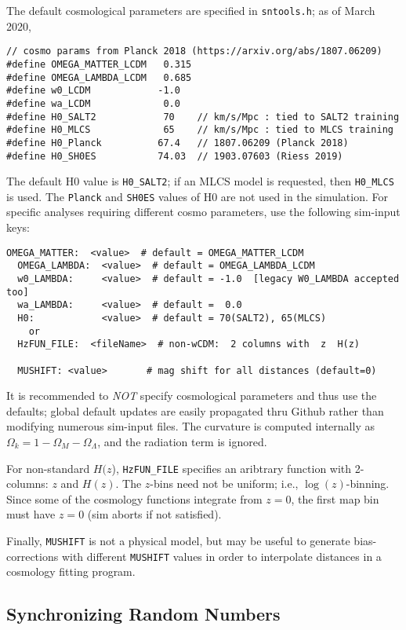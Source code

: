 \documentclass[12pt]{article}
\newcommand{\OM}{\Omega_M}
\newcommand{\OL}{\Omega_{\Lambda}}
\newcommand{\Ok}{\Omega_k}
\begin{document}
{The default cosmological parameters are specified in {\tt sntools.h};
as of March 2020,
%
\begin{Verbatim}[frame=single]
// cosmo params from Planck 2018 (https://arxiv.org/abs/1807.06209)
#define OMEGA_MATTER_LCDM   0.315 
#define OMEGA_LAMBDA_LCDM   0.685 
#define w0_LCDM            -1.0
#define wa_LCDM             0.0
#define H0_SALT2            70    // km/s/Mpc : tied to SALT2 training
#define H0_MLCS             65    // km/s/Mpc : tied to MLCS training
#define H0_Planck          67.4   // 1807.06209 (Planck 2018)
#define H0_SH0ES           74.03  // 1903.07603 (Riess 2019)
\end{Verbatim}
%
The default H0 value is {\tt H0\_SALT2};
if an MLCS model is requested, then {\tt H0\_MLCS} is used.
The {\tt Planck} and {\tt SH0ES} values of H0 are not used 
in the simulation.
For specific analyses requiring different cosmo parameters, 
use the following sim-input keys:
%
\begin{Verbatim}[frame=single]
  OMEGA_MATTER:  <value>  # default = OMEGA_MATTER_LCDM
  OMEGA_LAMBDA:  <value>  # default = OMEGA_LAMBDA_LCDM
  w0_LAMBDA:     <value>  # default = -1.0  [legacy W0_LAMBDA accepted too]
  wa_LAMBDA:     <value>  # default =  0.0
  H0:            <value>  # default = 70(SALT2), 65(MLCS)
    or
  HzFUN_FILE:  <fileName>  # non-wCDM:  2 columns with  z  H(z)

  MUSHIFT: <value>       # mag shift for all distances (default=0)
\end{Verbatim}
%
It is recommended to {\it NOT} specify cosmological parameters and thus
use the defaults; global default updates are easily propagated thru 
Github rather than modifying numerous sim-input files.
The curvature is computed internally as $\Ok = 1 - \OM - \OL$,
and the radiation term is ignored. 

For non-standard $H(z$), {\tt HzFUN\_FILE} specifies an aribtrary
function with 2-columns: $z$ and $H(z)$. 
The $z$-bins need not be uniform; i.e., $\log(z)$-binning. 
Since some of the cosmology functions integrate from $z=0$, 
the first map bin must have $z=0$ (sim aborts if not satisfied).

Finally, {\tt MUSHIFT} is not a physical model, but may be useful
to generate bias-corrections with different {\tt MUSHIFT} values
in order to interpolate distances in a cosmology fitting program.

   \clearpage
   \subsection{Synchronizing Random Numbers}
   \label{subsec:sim_ransync}

}
\end{document}
